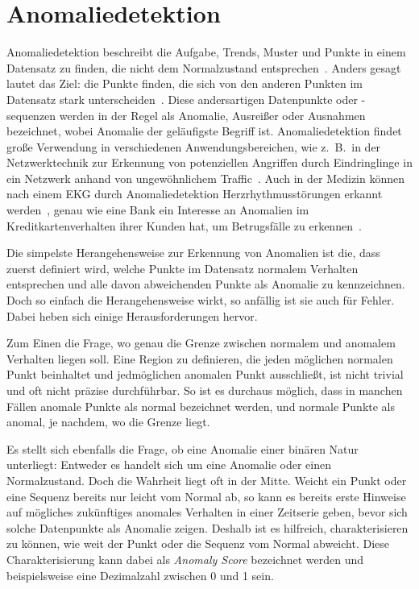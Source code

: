 \chapter{Anomaliedetektion}\label{ch:anomaliedetektion}
Anomaliedetektion beschreibt die Aufgabe, Trends, Muster und Punkte in einem Datensatz zu finden, die nicht dem Normalzustand
entsprechen~\cite{Chandola2009}. Anders gesagt lautet das Ziel: die Punkte finden, die sich von den anderen Punkten im Datensatz
stark unterscheiden~\cite[Kap.~10]{Tan2014}. Diese andersartigen Datenpunkte oder -sequenzen werden in der Regel als Anomalie,
Ausreißer oder Ausnahmen bezeichnet, wobei Anomalie der geläufigste Begriff ist. Anomaliedetektion findet große Verwendung in
verschiedenen Anwendungsbereichen, wie z.~B.~in der Netzwerktechnik zur Erkennung von potenziellen Angriffen durch Eindringlinge
in ein Netzwerk anhand von ungewöhnlichem Traffic~\Cite{Bernacki2015}. Auch in der Medizin können nach einem EKG durch
Anomaliedetektion Herzrhythmusstörungen erkannt werden~\cite{Chauhan2015}, genau wie eine Bank ein Interesse an Anomalien im
Kreditkartenverhalten ihrer Kunden hat, um Betrugsfälle zu erkennen~\cite{Jiang2023, CeronmaniSharmila2019}.

Die simpelste Herangehensweise zur Erkennung von Anomalien ist die, dass zuerst definiert wird, welche Punkte im Datensatz normalem
Verhalten entsprechen und alle davon abweichenden Punkte als Anomalie zu kennzeichnen. Doch so einfach die Herangehensweise wirkt,
so anfällig ist sie auch für Fehler. Dabei heben sich einige Herausforderungen hervor.

Zum Einen die Frage, wo genau die Grenze zwischen normalem und anomalem Verhalten liegen soll. Eine Region zu definieren, die jeden 
möglichen normalen Punkt beinhaltet und jedmöglichen anomalen Punkt ausschließt, ist nicht trivial und oft nicht präzise durchführbar.
So ist es durchaus möglich, dass in manchen Fällen anomale Punkte als normal bezeichnet werden, und normale Punkte als anomal, je
nachdem, wo die Grenze liegt.

Es stellt sich ebenfalls die Frage, ob eine Anomalie einer binären Natur unterliegt: Entweder es handelt sich um eine Anomalie oder
einen Normalzustand. Doch die Wahrheit liegt oft in der Mitte. Weicht ein Punkt oder eine Sequenz bereits nur leicht vom Normal ab,
so kann es bereits erste Hinweise auf mögliches zukünftiges anomales Verhalten in einer Zeitserie geben, bevor sich solche Datenpunkte
als Anomalie zeigen. Deshalb ist es hilfreich, charakterisieren zu können, wie weit der Punkt oder die Sequenz
vom Normal abweicht. Diese Charakterisierung kann dabei als \textit{Anomaly Score} bezeichnet werden und beispielsweise eine Dezimalzahl
zwischen 0 und 1 sein.

